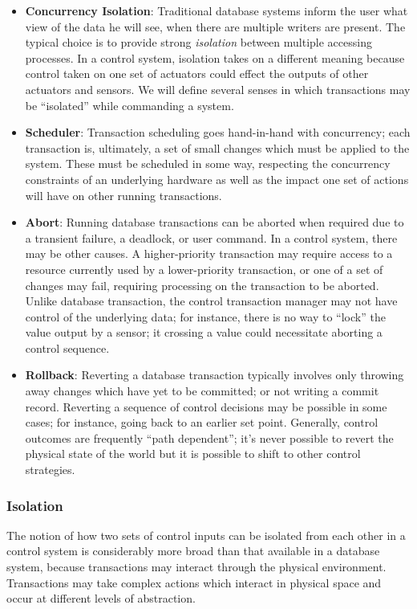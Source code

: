 \begin{itemize}
\item {\bf Concurrency Isolation}: Traditional database systems inform the user what view of the data he will see, when there are multiple writers are present.  The typical choice is to provide strong {\it isolation} between multiple accessing processes.  In a control system, isolation takes on a different meaning because control taken on one set of actuators could effect the outputs of other actuators and sensors.  We will define several senses in which transactions may be ``isolated'' while commanding a system.
\item {\bf Scheduler}: Transaction scheduling goes hand-in-hand with concurrency; each transaction is, ultimately, a set of small changes which must be applied to the system.  These must be scheduled in some way, respecting the concurrency constraints of an underlying hardware as well as the impact one set of actions will have on other running transactions.
\item {\bf Abort}: Running database transactions can be aborted when required due to a transient failure, a deadlock, or user command.  In a control system, there may be other causes.  A higher-priority transaction may require access to a resource currently used by a lower-priority transaction, or one of a set of changes may fail, requiring processing on the transaction to be aborted.  Unlike database transaction, the control transaction manager may not have control of the underlying data; for instance, there is no way to ``lock'' the value output by a sensor; it crossing a value could necessitate aborting a control sequence.
\item {\bf Rollback}: Reverting a database transaction typically involves only throwing away changes which have yet to be committed; or not writing a commit record.  Reverting a sequence of control decisions may be possible in some cases; for instance, going back to an earlier set point.  Generally, control outcomes are frequently ``path dependent''; it's never possible to revert the physical state of the world but it is possible to shift to other control strategies. 
\end{itemize}

\subsubsection{Isolation}

The notion of how two sets of control inputs can be isolated from each other in a control system is considerably more broad than that available in a database system, because transactions may interact through the physical environment.  Transactions may take complex actions which interact in physical space and occur at different levels of abstraction.

